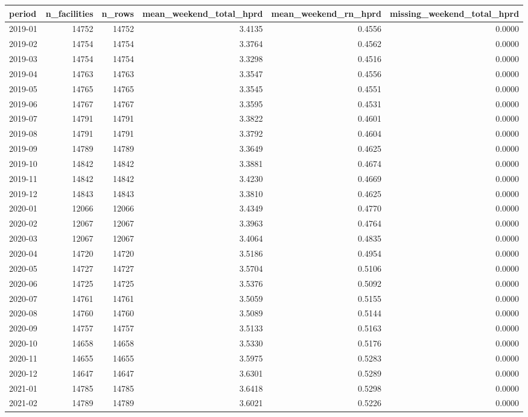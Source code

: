 \begin{tabular}{lrrrrr}
\toprule
period & n_facilities & n_rows & mean_weekend_total_hprd & mean_weekend_rn_hprd & missing_weekend_total_hprd \\
\midrule
2019-01 & 14752 & 14752 & 3.4135 & 0.4556 & 0.0000 \\
2019-02 & 14754 & 14754 & 3.3764 & 0.4562 & 0.0000 \\
2019-03 & 14754 & 14754 & 3.3298 & 0.4516 & 0.0000 \\
2019-04 & 14763 & 14763 & 3.3547 & 0.4556 & 0.0000 \\
2019-05 & 14765 & 14765 & 3.3545 & 0.4551 & 0.0000 \\
2019-06 & 14767 & 14767 & 3.3595 & 0.4531 & 0.0000 \\
2019-07 & 14791 & 14791 & 3.3822 & 0.4601 & 0.0000 \\
2019-08 & 14791 & 14791 & 3.3792 & 0.4604 & 0.0000 \\
2019-09 & 14789 & 14789 & 3.3649 & 0.4625 & 0.0000 \\
2019-10 & 14842 & 14842 & 3.3881 & 0.4674 & 0.0000 \\
2019-11 & 14842 & 14842 & 3.4230 & 0.4669 & 0.0000 \\
2019-12 & 14843 & 14843 & 3.3810 & 0.4625 & 0.0000 \\
2020-01 & 12066 & 12066 & 3.4349 & 0.4770 & 0.0000 \\
2020-02 & 12067 & 12067 & 3.3963 & 0.4764 & 0.0000 \\
2020-03 & 12067 & 12067 & 3.4064 & 0.4835 & 0.0000 \\
2020-04 & 14720 & 14720 & 3.5186 & 0.4954 & 0.0000 \\
2020-05 & 14727 & 14727 & 3.5704 & 0.5106 & 0.0000 \\
2020-06 & 14725 & 14725 & 3.5376 & 0.5092 & 0.0000 \\
2020-07 & 14761 & 14761 & 3.5059 & 0.5155 & 0.0000 \\
2020-08 & 14760 & 14760 & 3.5089 & 0.5144 & 0.0000 \\
2020-09 & 14757 & 14757 & 3.5133 & 0.5163 & 0.0000 \\
2020-10 & 14658 & 14658 & 3.5330 & 0.5176 & 0.0000 \\
2020-11 & 14655 & 14655 & 3.5975 & 0.5283 & 0.0000 \\
2020-12 & 14647 & 14647 & 3.6301 & 0.5289 & 0.0000 \\
2021-01 & 14785 & 14785 & 3.6418 & 0.5298 & 0.0000 \\
2021-02 & 14789 & 14789 & 3.6021 & 0.5226 & 0.0000 \\

\end{tabular}
